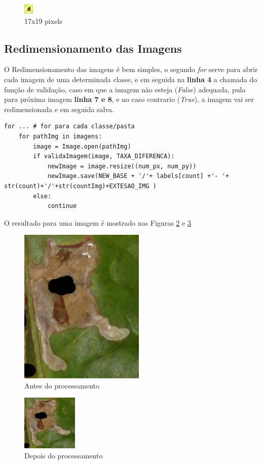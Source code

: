 \documentclass{article}
\begin{document}
\begin{figure}[ht!]
\centering
\includegraphics[scale=1]{img/ferr001.jpg}
\caption{17x19 pixels}
\label{fig:ferr001}
\end{figure}

\subsection{Redimensionamento das Imagens}

O Redimensionamento das imagens é bem simples, o segundo \textit{for} serve para abrir cada imagem de uma determinada classe, e em seguida na \textbf{linha 4} a chamada do função de validação, caso em que a imagem não esteja  (\textit{False}) adequada, pula para próxima imagem \textbf{linha 7 e 8}, e no caso contrario (\textit{True}), a imagem vai ser redimensionada e em seguida salva.
\begin{lstlisting}
for ... # for para cada classe/pasta
    for pathImg in imagens:
        image = Image.open(pathImg)
        if validaImagem(image, TAXA_DIFERENCA):
            newImage = image.resize((num_px, num_py))
            newImage.save(NEW_BASE + '/'+ labels[count] +'- '+ str(count)+'/'+str(countImg)+EXTESAO_IMG )
        else:
            continue
\end{lstlisting}

O resultado para uma imagem é mostrado nas Figuras \ref{fig:antes} e \ref{fig:depois}

\begin{figure}[ht!]
\centering
\includegraphics[scale=0.8]{img/antes.jpg}
\caption{Antes do processamento}
\label{fig:antes}
\end{figure}

\begin{figure}[ht!]
\centering
\includegraphics[scale=1]{img/depois.jpg}
\caption{Depois do processamento}
\label{fig:depois}
\end{figure}




\end{document}
